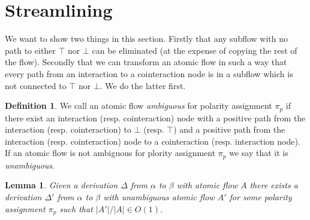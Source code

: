 \documentclass[a4paper]{amsart}
\newtheorem{lem}[thm]{Lemma}
\newtheorem{pro}[thm]{Proposition}
\theoremstyle{remark}
\theoremstyle{definition}
\newtheorem{defi}[thm]{Definition}
\begin{document}

\section{Streamlining}

We want to show two things in this section. Firstly that any subflow with no path to either $\top$ nor $\bot$ can be eliminated (at the expense of copying the rest of the flow). Secondly that we can transform an atomic flow in such a way that every path from an interaction to a cointeraction node is in a subflow which is not connected to $\top$ nor $\bot$. We do the latter first.

\begin{defi}
We call an atomic flow \emph{ambiguous} for polarity assignment $\pi_p$ if there exist an interaction (resp. cointeraction) node with a positive path from the interaction (resp. cointeraction) to $\bot$ (resp. $\top$) and a positive path from the interaction (resp. cointeraction) node to a cointeraction (resp. interaction node). If an atomic flow is not ambiguous for plority assignment $\pi_p$ we say that it is \emph{unambiguous}.
\end{defi}

\begin{lem}
Given a derivation $\Delta$ from $\alpha$ to $\beta$ with atomic flow $A$ there exists a derivation $\Delta'$ from $\alpha$ to $\beta$ with unambiguous atomic flow $A'$ for some polarity assignment $\pi_p$ such that $|A'|/|A|\in O(1)$.
\end{lem}
\end{document}
